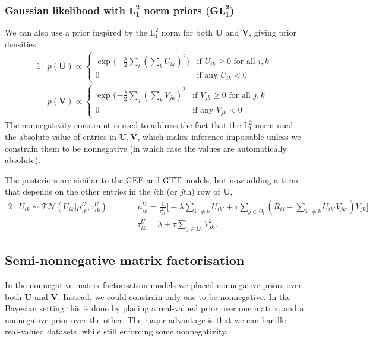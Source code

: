 \documentclass{article}
\newcommand{\U}{\boldsymbol U}
\newcommand{\V}{\boldsymbol V}
\newcommand{\sumOmegai}{\sum_{j \in \Omega_i}}
\newcommand{\sumexclk}{\sum_{k' \neq k}}
\newcommand{\diffexclk}{( R_{ij} - \sumexclk U_{ik'} V_{jk'} ) }
\begin{document}
		\subsubsection{Gaussian likelihood with $\boldsymbol{\text{L}^2_1}$ norm priors (G$\boldsymbol{\text{L}^2_1}$)}
		We can also use a prior inspired by the $\text{L}^2_1$ norm for both $\U$ and $\V$, giving prior densities
		\begin{alignat*}{1}
			& p ( \U ) \propto \left\{
			\begin{array}{ll}
			\displaystyle \exp \lbrace -\frac{\lambda}{2} \sum_i \left( \sum_k U_{ik} \right)^2 \rbrace   & \mbox{if } U_{ik} \geq 0 \mbox{ for all $i, k$} \\
			0 & \mbox{if any } U_{ik} < 0
			\end{array}
			\right. \\
			& p ( \V ) \propto \left\{
			\begin{array}{ll}
			\displaystyle \exp \lbrace -\frac{\lambda}{2} \sum_j \left( \sum_k V_{jk} \right)^2   & \mbox{if } V_{jk} \geq 0 \mbox{ for all $j, k$} \\
			0 & \mbox{if any } V_{jk} < 0
			\end{array}
			\right.
		\end{alignat*}
		The nonnegativity constraint is used to address the fact that the $\text{L}^2_1$ norm used the absolute value of entries in $\U, \V$, which makes inference impossible unless we constrain them to be nonnegative (in which case the values are automatically absolute).
		
		The posteriors are similar to the GEE and GTT models, but now adding a term that depends on the other entries in the $i$th (or $j$th) row of $\U$,
		\begin{alignat*}{2}
			& U_{ik} \sim \mathcal{TN} (U_{ik} | \mu^U_{ik}, \tau^U_{ik} )
			\quad\quad &&\mu^U_{ik} = \frac{1}{\tau^U_{ik}} \Bigg[ - \lambda \sumexclk U_{ik'} + \tau \sumOmegai \diffexclk V_{jk} \Bigg] \\
			& && \tau^U_{ik} = \lambda + \tau \sumOmegai V_{jk}^2.
		\end{alignat*}
		
		\subsection{Semi-nonnegative matrix factorisation}
		In the nonnegative matrix factorisation models we placed nonnegative priors over both $\U$ and $\V$.
		Instead, we could constrain only one to be nonnegative. In the Bayesian setting this is done by placing a real-valued prior over one matrix, and a nonnegative prior over the other. The major advantage is that we can handle real-valued datasets, while still enforcing some nonnegativity. 
		
\end{document}
